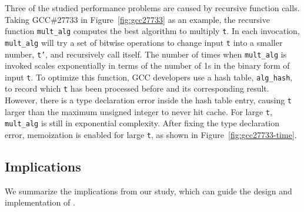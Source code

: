 Three of the studied performance problems are caused by recursive function calls. 
Taking GCC\#27733 in Figure~\ref{fig:gcc27733} as an example, 
the recursive function \texttt{mult\_alg} computes the best algorithm to multiply \texttt{t}.
In each invocation, \texttt{mult\_alg} will try a set of bitwise 
operations to change input 
\texttt{t} into a smaller number, \texttt{t'}, 
and recursively call itself.
The number of times when \texttt{mult\_alg} is invoked scales exponentially 
in terms of the number of 1s in the binary form of input \texttt{t}.
To optimize this function, 
GCC developers use a hash table, \texttt{alg\_hash}, to record
which \texttt{t} has been processed before and its corresponding result.
However, there is a type declaration error inside the hash table entry,
causing \texttt{t} larger than the maximum unsigned integer to never hit cache.
For large \texttt{t}, \texttt{mult\_alg} is still in exponential complexity. 
After fixing the type declaration error, 
memoization is enabled for large \texttt{t}, 
as shown in Figure~\ref{fig:gcc27733-time}.


 
\subsection{Implications}
\label{sec:study_impli}

We summarize the implications from our study, which can guide
the design and implementation of \Tool.

